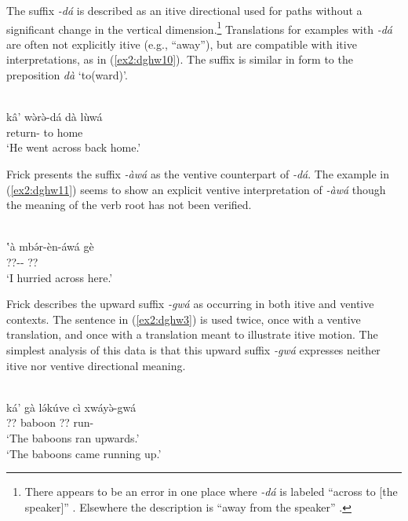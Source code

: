 The suffix \textit{-dá} is described as an itive directional used for paths without a significant change in the vertical dimension.\footnote{There appears to be an error in one place where \textit{-dá} is labeled ``across to [the speaker]'' \citep[20]{frickVerbalSystemDghwede1978}. Elsewhere the description is ``away from the speaker'' \citep[5, 18, 19]{frickVerbalSystemDghwede1978}.} Translations for examples with \textit{-dá} are often not explicitly itive (e.g., ``away''), but are compatible with itive interpretations, as in (\ref{ex2:dghw10}). The suffix is similar in form to the preposition \textit{dà} `to(ward)'. 

\ea\label{ex2:dghw10}
 \\
\gll kâ' wə̀rə̀-dá dà lùwá	\\
 return- to home \\
\glt `He went across back home.'
\z 

Frick presents the suffix \textit{-àwá} as the ventive counterpart of \textit{-dá}. The example in (\ref{ex2:dghw11}) seems to show an explicit ventive interpretation of \textit{-àwá} though the meaning of the verb root has not been verified. 

\ea\label{ex2:dghw11}
 \\
\gll ʽà mbə́r-èn-áwá gè \\
 ??-- ?? \\
\glt `I hurried across here.'
\z 

Frick describes the upward suffix \textit{-gwá} as occurring in both itive and ventive contexts. The sentence in (\ref{ex2:dghw3}) is used twice, once with a ventive translation, and once with a translation meant to illustrate itive motion. The simplest analysis of this data is that this upward suffix \textit{-gwá} expresses neither itive nor ventive directional meaning. 

\ea\label{ex2:dghw3}
 \\
\gll ká' gà lə́kúve cì xwáyə̀-gwá	\\
 ?? baboon ?? run-	\\
\glt `The baboons ran upwards.'  \citep[20]{frickVerbalSystemDghwede1978} \\
`The baboons came running up.'	\citep[23]{frickVerbalSystemDghwede1978}	 	
\z 

